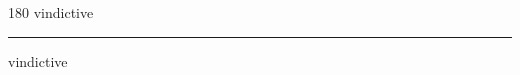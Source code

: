 
\begin{frame}
\begin{center}
\begin{turn}{180}
{\fontsize{2.5cm}{1em}\selectfont vindictive}
\end{turn}
\vspace{1em}\par  
\hrule
\vspace{1em}\par  
{\fontsize{2.5cm}{1em}\selectfont vindictive}
\end{center}
\end{frame}
